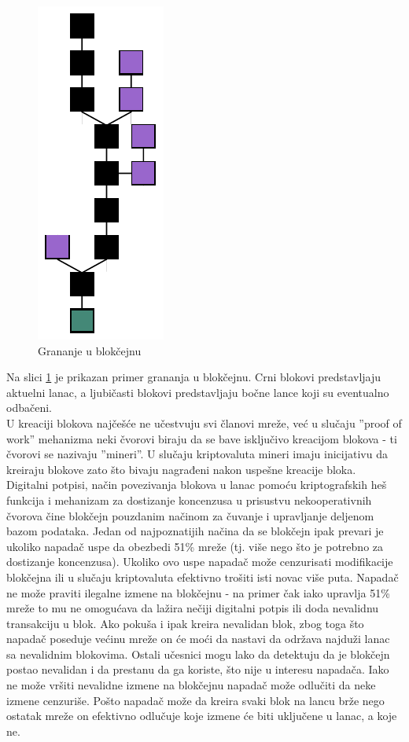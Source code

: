 \documentclass[a4paper]{article}
\begin{document}
{\begin{figure}[H]
    \centering
        \includegraphics[scale=0.7,angle=-90,origin=c]{blockchain_fork.pdf}
    \caption{Grananje u blokčejnu}
    \label{fig:blockchain_fork}
\end{figure}

Na slici \ref{fig:blockchain_fork} je prikazan primer grananja u blokčejnu. Crni blokovi predstavljaju aktuelni lanac,
a ljubičasti blokovi predstavljaju bočne lance koji su eventualno odbačeni.\\
U kreaciji blokova najčešće ne učestvuju svi članovi mreže, već u slučaju ''proof of work'' mehanizma neki čvorovi biraju
da se bave isključivo kreacijom blokova - ti čvorovi se nazivaju ''mineri''. U slučaju kriptovaluta mineri imaju inicijativu
da kreiraju blokove zato što bivaju nagrađeni nakon uspešne kreacije bloka.\\ 
Digitalni potpisi, način povezivanja blokova u lanac pomoću kriptografskih heš funkcija i mehanizam za dostizanje
koncenzusa u prisustvu nekooperativnih čvorova čine blokčejn pouzdanim načinom za čuvanje i upravljanje deljenom bazom podataka.
Jedan od najpoznatijih načina da se blokčejn ipak prevari je ukoliko napadač uspe da obezbedi 51\% mreže
(tj. više nego što je potrebno za dostizanje koncenzusa). Ukoliko ovo uspe napadač može cenzurisati modifikacije blokčejna
ili u slučaju kriptovaluta efektivno trošiti isti novac više puta. Napadač ne može praviti ilegalne
izmene na blokčejnu - na primer čak iako upravlja 51\% mreže to mu ne omogućava da lažira nečiji digitalni potpis
ili doda nevalidnu transakciju u blok. Ako pokuša i ipak kreira nevalidan blok, zbog toga što napadač poseduje
većinu mreže on će moći da nastavi da održava najduži lanac sa nevalidnim blokovima. Ostali učesnici
mogu lako da detektuju da je blokčejn postao nevalidan i da prestanu da ga koriste, što nije u interesu napadača.
Iako ne može vršiti nevalidne izmene na blokčejnu napadač može odlučiti da neke izmene cenzuriše.
Pošto napadač može da kreira svaki blok na lancu brže nego ostatak mreže on efektivno odlučuje koje izmene
će biti uključene u lanac, a koje ne.

}
\end{document}
